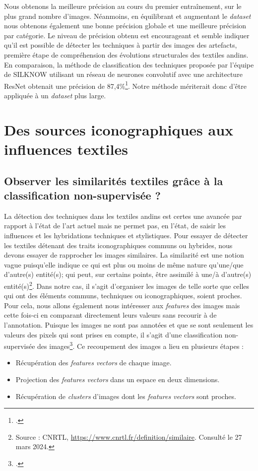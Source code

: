 Nous obtenons la meilleure précision au cours du premier entraînement, sur le plus grand nombre d'images. Néanmoins, en équilibrant et augmentant le \textit{dataset} nous obtenons également une bonne précision globale et une meilleure précision par catégorie. Le niveau de précision obtenu est encourageant et semble indiquer qu'il est possible de détecter les techniques à partir des images des artefacts, première étape de compréhension des évolutions structurales des textiles andins. En comparaison, la méthode de classification des techniques proposée par l'équipe de SILKNOW utilisant un réseau de neurones convolutif avec une architecture ResNet obtenait une précision de 87,4\%\footcite[p.~53]{dorozynskiMultiTaskDeepLearning2019}.
Notre méthode mériterait donc d'être appliquée à un \textit{dataset} plus large.




\section{Des sources iconographiques aux influences textiles}
\subsection{Observer les similarités textiles grâce à la classification non-supervisée ?}

La détection des techniques dans les textiles andins est certes une avancée par rapport à l'état de l'art actuel mais ne permet pas, en l'état, de saisir les influences et les hybridations techniques et stylistiques. Pour essayer de détecter les textiles détenant des traits iconographiques communs ou hybrides, nous devons essayer de rapprocher les images similaires. La similarité est une notion vague puisqu'elle indique ce \og qui est plus ou moins de même nature qu'une/que d'autre(s) entité(s); qui peut, sur certains points, être assimilé à une/à d'autre(s) entité(s)\fg\footnote{Source : CNRTL, \url{https://www.cnrtl.fr/definition/similaire}. Consulté le 27 mars 2024.}. Dans notre cas, il s'agit d'organiser les images de telle sorte que celles qui ont des éléments communs, techniques ou iconographiques, soient proches. Pour cela, nous allons également nous intéresser aux \textit{features} des images mais cette fois-ci en comparant directement leurs valeurs sans recourir à de l'annotation. Puisque les images ne sont pas annotées et que se sont seulement les valeurs des pixels qui sont prises en compte, il s'agit d'une classification non-supervisée des images\footcite[p.~439]{lecunDeepLearning2015}. Ce recoupement des images a lieu en plusieurs étapes : 
\begin{itemize}
	\item Récupération des \textit{features vectors} de chaque image.
	\item Projection des \textit{features vectors} dans un espace en deux dimensions.
	\item Récupération de \textit{clusters} d'images dont les \textit{features vectors} sont proches.\\
\end{itemize}


